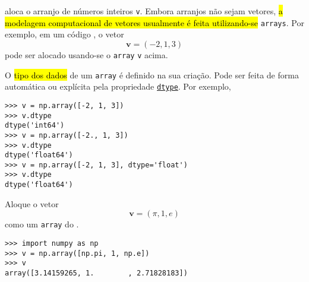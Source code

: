 aloca o arranjo de números inteiros \lstinline+v+. Embora arranjos não sejam vetores, \hl{a modelagem computacional de vetores usualmente é feita utilizando-se} \lstinline+arrays+. Por exemplo, em um código {\python}, o vetor
\begin{equation}
  \pmb{v} = (-2, 1, 3)
\end{equation}
pode ser alocado usando-se o \lstinline+array+ \lstinline+v+ acima.

O \hl{tipo dos dados} de um \lstinline+array+ é definido na sua criação. Pode ser feita de forma automática ou explícita pela propriedade \href{https://numpy.org/doc/stable/reference/arrays.dtypes.html}{\lstinline+dtype+}. Por exemplo,

\begin{lstlisting}
>>> v = np.array([-2, 1, 3])
>>> v.dtype
dtype('int64')
>>> v = np.array([-2., 1, 3])
>>> v.dtype
dtype('float64')
>>> v = np.array([-2, 1, 3], dtype='float')
>>> v.dtype
dtype('float64')
\end{lstlisting}

\begin{ex}
  Aloque o vetor
  \begin{equation}
    \pmb{v} = (\pi, 1, e)
  \end{equation}
  como um \lstinline+array+ do {\numpy}.

\begin{lstlisting}
>>> import numpy as np
>>> v = np.array([np.pi, 1, np.e])
>>> v
array([3.14159265, 1.        , 2.71828183])
\end{lstlisting}

\end{ex}

